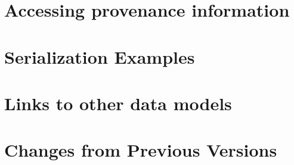 \documentclass[11pt,a4paper]{ivoa}
\begin{document}
\section{Accessing provenance information}
\label{sec:provaccess}


%

\begin{appendices}

\section{Serialization Examples}
\label{sec:appendix-serialization-examples}



%

\section{Links to other data models}
\label{sec:dmlinks}


\clearpage

\section{Changes from Previous Versions}

\end{appendices}
\end{document}
